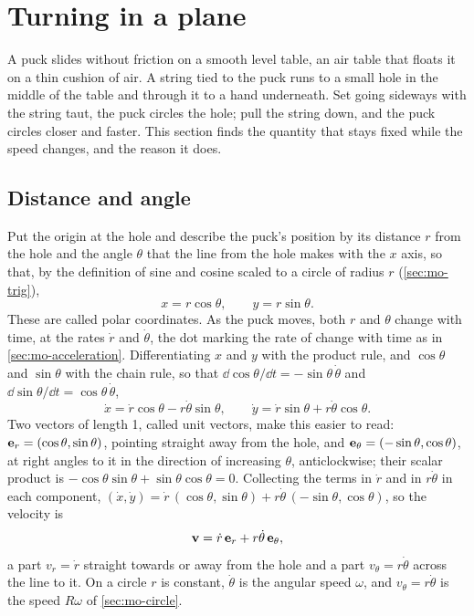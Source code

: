 \section{Turning in a plane}
\label{sec:ro-plane}

A puck slides without friction on a smooth level table, an air table that
floats it on a thin cushion of air. A string tied to the puck runs to a
small hole in the middle of the table and through it to a hand underneath.
Set going sideways with the string taut, the puck circles the hole; pull
the string down, and the puck circles closer and faster. This section
finds the quantity that stays fixed while the speed changes, and the
reason it does.

\subsection*{Distance and angle}

Put the origin at the hole and describe the puck's position by its
distance $r$ from the hole and the angle $\theta$ that the line from the
hole makes with the $x$ axis, so that, by the definition of sine and
cosine scaled to a circle of radius $r$ (\cref{sec:mo-trig}),
\begin{equation*}
   x = r\cos\theta , \qquad y = r\sin\theta .
\end{equation*}
These are called polar coordinates. As the puck moves, both $r$ and
$\theta$ change with time, at the rates $\dot r$ and $\dot\theta$, the dot
marking the rate of change with time as in \cref{sec:mo-acceleration}.
Differentiating $x$ and $y$ with the product rule, and $\cos\theta$ and $\sin\theta$ with the chain rule, so that
$\dd\cos\theta/\dd t = -\sin\theta\,\dot\theta$ and $\dd\sin\theta/\dd t =
\cos\theta\,\dot\theta$,
\begin{equation*}
   \dot{x} = \dot{r}\cos\theta - r\dot\theta\sin\theta , \qquad
   \dot{y} = \dot{r}\sin\theta + r\dot\theta\cos\theta .
\end{equation*}
Two vectors of length 1, called unit vectors,
make this easier to read: $\bm{\mathrm{e}}_r = (\cos\theta, \sin\theta)$, pointing
straight away from the hole, and $\bm{\mathrm{e}}_\theta = (-\sin\theta,
\cos\theta)$, at right angles to it in the direction of increasing
$\theta$, anticlockwise; their scalar product is $-\cos\theta\sin\theta +
\sin\theta\cos\theta = 0$. Collecting the terms in $\dot r$ and in $r\dot
\theta$ in each component, $(\dot x, \dot y) = \dot r\,(\cos\theta,
\sin\theta) + r\dot\theta\,(-\sin\theta, \cos\theta)$, so the velocity is
\begin{equation}
   \bm{\mathrm{v}} = \dot{r}\,\bm{\mathrm{e}}_r + r\dot\theta\,\bm{\mathrm{e}}_\theta ,
   \label{eq:ro-polar}
\end{equation}
a part $v_r = \dot r$ straight towards or away from the hole and a part
$v_\theta = r\dot\theta$ across the line to it. On a circle $r$ is
constant, $\dot\theta$ is the angular speed $\omega$, and $v_\theta =
r\dot\theta$ is the speed $R\omega$ of \cref{sec:mo-circle}.

